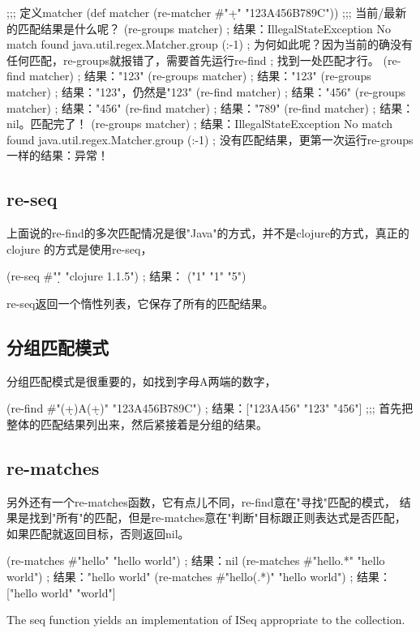 \documentclass[a4paper,11pt]{article}
\begin{document}
  \begin{schemecode}
;;; 定义matcher
(def matcher (re-matcher #"\d+" "123A456B789C"))
;;; 当前/最新的匹配结果是什么呢？
(re-groups matcher)
; 结果：IllegalStateException No match found  java.util.regex.Matcher.group (:-1)
; 为何如此呢？因为当前的确没有任何匹配，re-groups就报错了，需要首先运行re-find
; 找到一处匹配才行。
(re-find matcher)
; 结果："123"
(re-groups matcher)
; 结果："123"
(re-groups matcher)
; 结果："123"，仍然是"123"
(re-find matcher)
; 结果："456"
(re-groups matcher)
; 结果："456"
(re-find matcher)
; 结果："789"
(re-find matcher)
; 结果：nil。匹配完了！
(re-groups matcher)
; 结果：IllegalStateException No match found  java.util.regex.Matcher.group (:-1)
; 没有匹配结果，更第一次运行re-groups一样的结果：异常！
  \end{schemecode}

  \subsection[re-seq]{re-seq}
  上面说的re-find的多次匹配情况是很"Java"的方式，并不是clojure的方式，真正的clojure
  的方式是使用re-seq，

  \begin{schemecode}
(re-seq #"\d" "clojure 1.1.5")
; 结果： ("1" "1" "5")
  \end{schemecode}

  re-seq返回一个惰性列表，它保存了所有的匹配结果。

  \subsection[分组匹配模式]{分组匹配模式}
  分组匹配模式是很重要的，如找到字母A两端的数字，

  \begin{schemecode}
(re-find #"(\d+)A(\d+)" "123A456B789C")
; 结果：["123A456" "123" "456"]
;;; 首先把整体的匹配结果列出来，然后紧接着是分组的结果。
  \end{schemecode}

  \subsection[re-matches]{re-matches}
  另外还有一个re-matches函数，它有点儿不同，re-find意在"寻找"匹配的模式，
  结果是找到"所有"的匹配，但是re-matches意在"判断"目标跟正则表达式是否匹配，
  如果匹配就返回目标，否则返回nil。

  \begin{schemecode}
(re-matches #"hello" "hello world")
; 结果：nil
(re-matches #"hello.*" "hello world")
; 结果："hello world"
(re-matches #"hello(.*)" "hello world")
; 结果：["hello world" "world"]
  \end{schemecode}

  


  
  
  
   The seq function yields an implementation of ISeq appropriate to the collection. 
\end{document}
